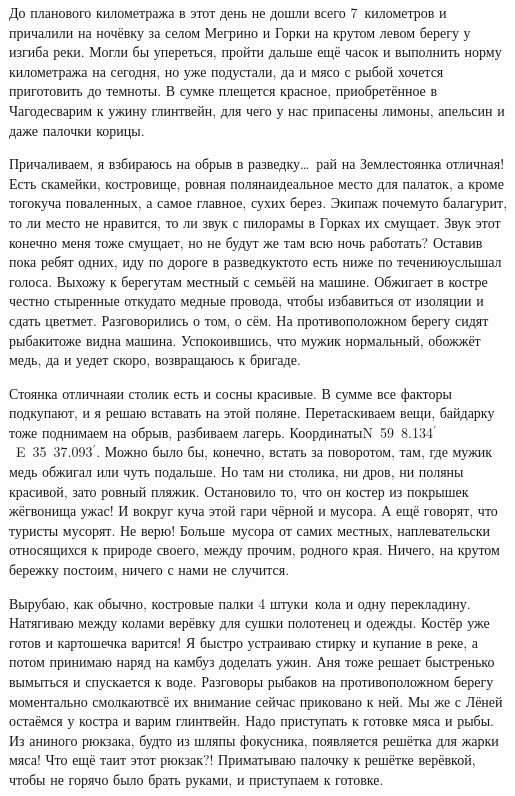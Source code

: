 До планового километража в этот день не дошли всего 7~километров и причалили на ночёвку за селом Мегрино и Горки на крутом левом берегу у изгиба реки. Могли бы упереться, пройти дальше ещё часок и выполнить норму километража на сегодня, но уже подустали, да и мясо с рыбой хочется приготовить до темноты. В сумке плещется красное, приобретённое в Чагоде\mdash сварим к ужину глинтвейн, для чего у нас припасены лимоны, апельсин и даже палочки корицы. 

Причаливаем, я взбираюсь на обрыв в разведку\ldots~рай на Земле\mdash стоянка отличная! Есть скамейки, костровище, ровная поляна\mdash идеальное место для палаток, а кроме того\mdash куча поваленных, а самое главное, сухих берез. Экипаж почему\sdash то балагурит, то ли место не нравится, то ли звук с пилорамы в Горках их смущает. Звук этот конечно меня тоже смущает, но не будут же там всю ночь работать? Оставив пока ребят одних, иду по дороге в разведку\mdash кто\sdash то есть ниже по течению\mdash услышал голоса. Выхожу к берегу\mdash там местный с семьёй на машине. Обжигает в костре честно стыренные откуда\sdash то медные провода, чтобы избавиться от изоляции и сдать цветмет. Разговорились о том, о сём. На противоположном берегу сидят рыбаки\mdash тоже видна машина. Успокоившись, что мужик нормальный, обожжёт медь, да и уедет скоро, возвращаюсь к бригаде. 

Стоянка отличная\mdash и столик есть и сосны красивые. В сумме все факторы подкупают, и я решаю вставать на этой поляне. Перетаскиваем вещи, байдарку тоже поднимаем на обрыв, разбиваем лагерь. Координаты\mdash N~59\degree~8.134$^\prime$ ~E~35\degree~37.093$^\prime$. Можно было бы, конечно, встать за поворотом, там, где мужик медь обжигал или чуть подальше. Но там ни столика, ни дров, ни поляны красивой, зато ровный пляжик. Остановило то, что он костер из покрышек жёг\mdash вонища ужас! И вокруг куча этой гари чёрной и мусора. А ещё говорят, что туристы мусорят. Не верю! Больше~мусора от самих местных, наплевательски относящихся к природе своего, между прочим, родного края. Ничего, на крутом бережку постоим, ничего с нами не случится.

Вырубаю, как обычно, костровые палки 4 штуки~кола и одну перекладину. Натягиваю между колами верёвку для сушки полотенец и одежды. Костёр уже готов и картошечка варится! Я быстро устраиваю стирку и купание в реке, а потом принимаю наряд на камбуз доделать ужин. Аня тоже решает быстренько вымыться и спускается к воде. Разговоры рыбаков на противоположном берегу моментально смолкают\mdash всё их внимание сейчас приковано к ней. Мы же с Лёней остаёмся у костра и варим глинтвейн. Надо приступать к готовке мяса и рыбы. Из аниного рюкзака, будто из шляпы фокусника, появляется решётка для жарки мяса! Что ещё таит этот рюкзак?! Приматываю палочку к решётке верёвкой, чтобы не горячо было брать руками, и приступаем к готовке. 

